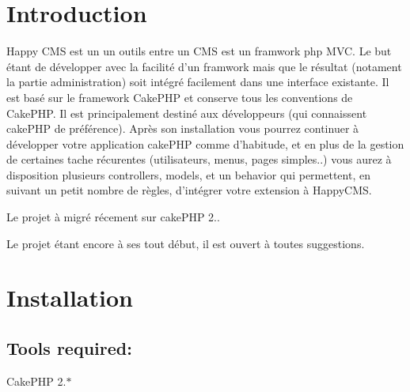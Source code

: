 \hypertarget{index_intro_sec}{}\section{\-Introduction}\label{index_intro_sec}
\-Happy \-C\-M\-S est un un outils entre un \-C\-M\-S est un framwork php \-M\-V\-C. \-Le but étant de développer avec la facilité d'un framwork mais que le résultat (notament la partie administration) soit intégré facilement dans une interface existante. \-Il est basé sur le framework \-Cake\-P\-H\-P et conserve tous les conventions de \-Cake\-P\-H\-P. \-Il est principalement destiné aux développeurs (qui connaissent cake\-P\-H\-P de préférence). \-Après son installation vous pourrez continuer à développer votre application cake\-P\-H\-P comme d'habitude, et en plus de la gestion de certaines tache récurentes (utilisateurs, menus, pages simples..) vous aurez à disposition plusieurs controllers, models, et un behavior qui permettent, en suivant un petit nombre de règles, d'intégrer votre extension à \-Happy\-C\-M\-S. \par
\par
 \-Le projet à migré récement sur cake\-P\-H\-P 2.. \par
\par
 \-Le projet étant encore à ses tout début, il est ouvert à toutes suggestions.\hypertarget{index_install_sec}{}\section{\-Installation}\label{index_install_sec}
\hypertarget{index_tools_subsec}{}\subsection{\-Tools required\-:}\label{index_tools_subsec}

\begin{DoxyItemize}
\item \-Cake\-P\-H\-P 2.$\ast$
\end{DoxyItemize}

